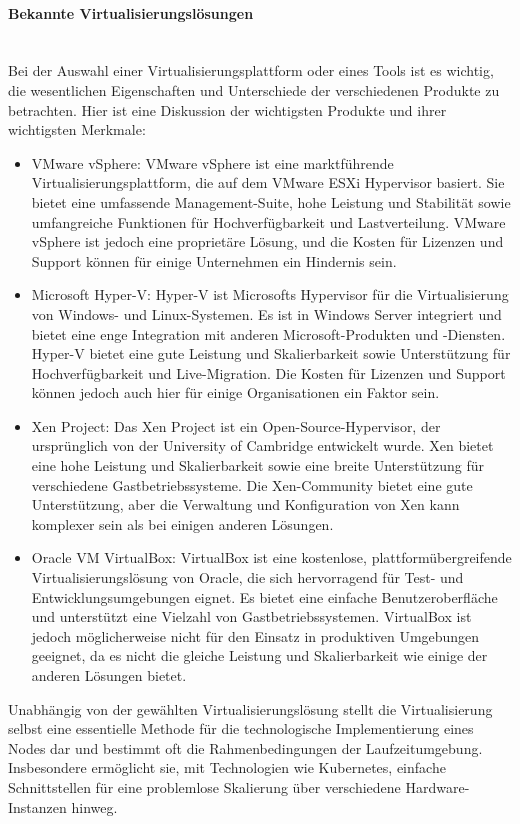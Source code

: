 \paragraph{Bekannte Virtualisierungslösungen\\\\}
Bei der Auswahl einer Virtualisierungsplattform oder eines Tools ist es wichtig, die wesentlichen Eigenschaften und Unterschiede der verschiedenen Produkte zu betrachten. Hier ist eine Diskussion der wichtigsten Produkte und ihrer wichtigsten Merkmale:
\begin{itemize}
\item VMware vSphere: VMware vSphere ist eine marktführende Virtualisierungsplattform, die auf dem VMware ESXi Hypervisor basiert. Sie bietet eine umfassende Management-Suite, hohe Leistung und Stabilität sowie umfangreiche Funktionen für Hochverfügbarkeit und Lastverteilung. VMware vSphere ist jedoch eine proprietäre Lösung, und die Kosten für Lizenzen und Support können für einige Unternehmen ein Hindernis sein.
\item Microsoft Hyper-V: Hyper-V ist Microsofts Hypervisor für die Virtualisierung von Windows- und Linux-Systemen. Es ist in Windows Server integriert und bietet eine enge Integration mit anderen Microsoft-Produkten und -Diensten. Hyper-V bietet eine gute Leistung und Skalierbarkeit sowie Unterstützung für Hochverfügbarkeit und Live-Migration. Die Kosten für Lizenzen und Support können jedoch auch hier für einige Organisationen ein Faktor sein.
\item Xen Project: Das Xen Project ist ein Open-Source-Hypervisor, der ursprünglich von der University of Cambridge entwickelt wurde. Xen bietet eine hohe Leistung und Skalierbarkeit sowie eine breite Unterstützung für verschiedene Gastbetriebssysteme. Die Xen-Community bietet eine gute Unterstützung, aber die Verwaltung und Konfiguration von Xen kann komplexer sein als bei einigen anderen Lösungen.
\item Oracle VM VirtualBox: VirtualBox ist eine kostenlose, plattformübergreifende Virtualisierungslösung von Oracle, die sich hervorragend für Test- und Entwicklungsumgebungen eignet. Es bietet eine einfache Benutzeroberfläche und unterstützt eine Vielzahl von Gastbetriebssystemen. VirtualBox ist jedoch möglicherweise nicht für den Einsatz in produktiven Umgebungen geeignet, da es nicht die gleiche Leistung und Skalierbarkeit wie einige der anderen Lösungen bietet.
\end{itemize}

Unabhängig von der gewählten Virtualisierungslösung stellt die Virtualisierung selbst eine essentielle Methode für die technologische Implementierung eines Nodes dar und bestimmt oft die Rahmenbedingungen der Laufzeitumgebung. Insbesondere ermöglicht sie, mit Technologien wie Kubernetes, einfache Schnittstellen für eine problemlose Skalierung über verschiedene Hardware-Instanzen hinweg.

